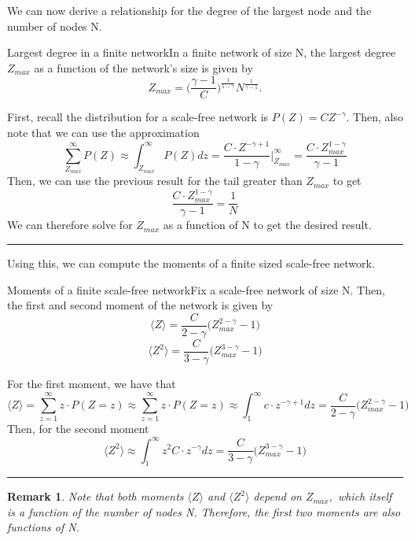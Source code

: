 \documentclass[twoside]{article}
\newtheorem{remark}[theorem]{Remark}
\newenvironment{proof}{{\bf Proof:}}{\hfill\rule{2mm}{2mm}}
\begin{document}
We can now derive a relationship for the degree of the largest node and the number of nodes N.

\begin{theorem_exam}{Largest degree in a finite network}{}In a finite network of size N, the largest degree $Z_{max}$ as a function of the network's size is given by 
$$
Z_{max} = \bigg(\frac{\gamma - 1}{C} \bigg)^{\frac{1}{1 - \gamma}}N^{\frac{1}{\gamma - 1}}.
$$
\end{theorem_exam}

\begin{proof}
First, recall the distribution for a scale-free network is $P(Z) = CZ^{-\gamma}$. Then, also note that we can use the approximation 
$$
\sum_{Z_{max}}^{\infty}P(Z) \approx \int_{Z_{max}}^{\infty}P(Z)dz = \frac{C\cdot Z^{-\gamma + 1}}{1 - \gamma}\bigg|_{Z_{max}}^{\infty} = \frac{C \cdot Z_{max}^{1 - \gamma}}{\gamma - 1}
$$
Then, we can use the previous result for the tail greater than $Z_{max}$ to get 
$$
\frac{C \cdot Z_{max}^{1 - \gamma}}{\gamma - 1} = \frac{1}{N}
$$
We can therefore solve for $Z_{max}$ as a function of N to get the desired result.
\end{proof}

Using this, we can compute the moments of a finite sized scale-free network.
\begin{proposition_exam}{Moments of a finite scale-free network}{}Fix a scale-free network of size N. Then, the first and second moment of the network is given by 
$$
\langle Z \rangle = \frac{C}{2 - \gamma}\bigg(Z_{max}^{2 - \gamma} - 1 \bigg)
$$
$$
\langle Z^2 \rangle = \frac{C}{3 - \gamma}\bigg(Z_{max}^{3 - \gamma} - 1 \bigg)
$$
\end{proposition_exam}

\begin{proof} For the first moment, we have that 
$$
\langle Z \rangle = \sum_{z=1}^{\infty}z \cdot P(Z = z) \approx \sum_{z=1}^{\infty}z \cdot P(Z = z) \approx \int_{1}^{\infty} c\cdot z^{-\gamma + 1}dz = \frac{C}{2 - \gamma}\bigg(Z_{max}^{2 - \gamma} - 1 \bigg)
$$
Then, for the second moment
$$
\langle Z^2 \rangle \approx \int_{1}^{\infty}z^2 C \cdot z^{-\gamma}dz = \frac{C}{3 - \gamma}\bigg(Z_{max}^{3 - \gamma} - 1 \bigg)
$$
\end{proof}

\begin{remark} Note that both moments $\langle Z \rangle$ and $\langle Z^2 \rangle$ depend on $Z_{max},$ which itself is a function of the number of nodes N. Therefore, the first two moments are also functions of N.
\end{remark}
\end{document}
